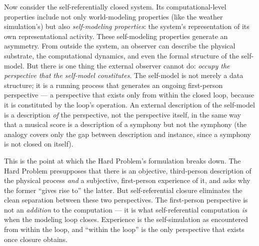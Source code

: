 \documentclass[12pt]{article}
\newcommand{\revend}{}
\begin{document}
{Now consider the self-referentially closed system. Its computational-level properties include not only world-modeling properties (like the weather simulation's) but also \emph{self-modeling properties}: the system's representation of its own representational activity. These self-modeling properties generate an asymmetry. From outside the system, an observer can describe the physical substrate, the computational dynamics, and even the formal structure of the self-model. But there is one thing the external observer cannot do: \emph{occupy the perspective that the self-model constitutes}. The self-model is not merely a data structure; it is a running process that generates an ongoing first-person perspective --- a perspective that exists only from within the closed loop, because it is constituted by the loop's operation. An external description of the self-model is a description \emph{of} the perspective, not the perspective itself, in the same way that a musical score is a description of a symphony but not the symphony (the analogy covers only the gap between description and instance, since a symphony is not closed on itself).

This is the point at which the Hard Problem's formulation breaks down. The Hard Problem presupposes that there is an objective, third-person description of the physical process \emph{and} a subjective, first-person experience of it, and asks why the former ``gives rise to'' the latter. But self-referential closure eliminates the clean separation between these two perspectives. The first-person perspective is not an \emph{addition} to the computation --- it is what self-referential computation \emph{is} when the modeling loop closes. Experience is the self-simulation as encountered from within the loop, and ``within the loop'' is the only perspective that exists once closure obtains.\revend}
\end{document}

